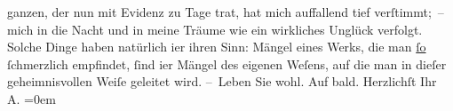                     ganzen, der nun mit Evidenz zu Tage trat, hat mich auffallend tief verſtimmt; –
                    mich in die Nacht und in meine Träume wie ein wirkliches Unglück ver{\pb}folgt. Solche Dinge haben natürlich i{\geminationm}er ihren Sinn: Mängel eines Werks, die man \uline{ſo}{ }ſchmerzlich empfindet, ſind i{\geminationm}er Mängel des eigenen Weſens, auf die man in
                    dieſer geheimnisvollen Weiſe geleitet wird.\pend
           \pstart
           – Leben Sie wohl. Auf bald.\pend
           \pstart
           Herzlichſt Ihr{\\[\baselineskip]}\spacefill\mbox{A.}\pend
           \leftskip=0em{}\endnumbering{}  
      